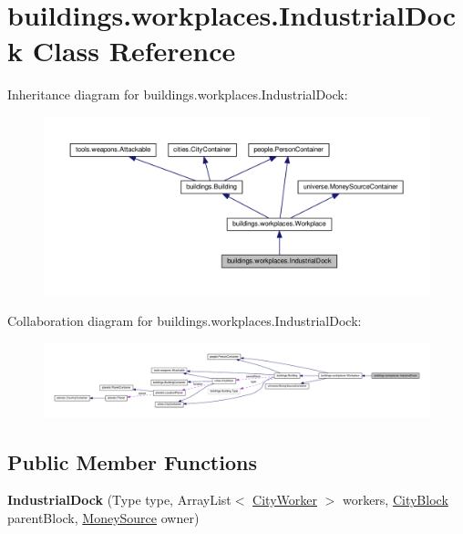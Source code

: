 \hypertarget{classbuildings_1_1workplaces_1_1_industrial_dock}{}\section{buildings.\+workplaces.\+Industrial\+Dock Class Reference}
\label{classbuildings_1_1workplaces_1_1_industrial_dock}


Inheritance diagram for buildings.\+workplaces.\+Industrial\+Dock\+:\nopagebreak
\begin{figure}[H]
\begin{center}
\leavevmode
\includegraphics[width=350pt]{classbuildings_1_1workplaces_1_1_industrial_dock__inherit__graph}
\end{center}
\end{figure}


Collaboration diagram for buildings.\+workplaces.\+Industrial\+Dock\+:\nopagebreak
\begin{figure}[H]
\begin{center}
\leavevmode
\includegraphics[width=350pt]{classbuildings_1_1workplaces_1_1_industrial_dock__coll__graph}
\end{center}
\end{figure}
\subsection*{Public Member Functions}
\begin{DoxyCompactItemize}
\item 
{\bfseries Industrial\+Dock} (Type type, Array\+List$<$ \hyperlink{classpeople_1_1cityworkers_1_1_city_worker}{City\+Worker} $>$ workers, \hyperlink{classcities_1_1_city_block}{City\+Block} parent\+Block, \hyperlink{classuniverse_1_1_money_source}{Money\+Source} owner)\hypertarget{classbuildings_1_1workplaces_1_1_industrial_dock_a565a9f7f72553ccfeca83a413d05e2cb}{}\label{classbuildings_1_1workplaces_1_1_industrial_dock_a565a9f7f72553ccfeca83a413d05e2cb}

\end{DoxyCompactItemize}
